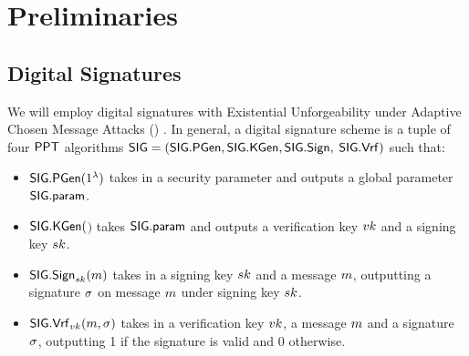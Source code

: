 \section{Preliminaries}


\subsection{Digital Signatures}\label{sec:sig}
We will employ digital signatures with Existential Unforgeability under Adaptive Chosen Message Attacks (\eufcma) \cite{C:GolMicRiv84}. In general, a digital signature scheme is a tuple of four $\mathsf{PPT}$ algorithms $\mathsf{SIG}=(\mathsf{SIG}.\mathsf{PGen},\mathsf{SIG}.\mathsf{KGen},\mathsf{SIG}.\mathsf{Sign},$ $\mathsf{SIG}.\mathsf{Vrf})$ such that:

\begin{itemize}[noitemsep]
\item $\mathsf{SIG}.\mathsf{PGen}(1^{\lambda})$ takes in a security parameter and outputs a global parameter $\mathsf{SIG}.\mathsf{param}$.
\item $\mathsf{SIG}.\mathsf{KGen}($\sigparam$)$ takes $\mathsf{SIG}.\mathsf{param}$ and outputs a verification key $vk$ and a signing key $sk$.
\item $\mathsf{SIG}.\mathsf{Sign}_{sk}(m)$ takes in a signing key $sk$ and a message $m$, outputting a signature $\sigma$ on message $m$ under signing key $sk$.
\item $\mathsf{SIG}.\mathsf{Vrf}_{vk}(m,\sigma)$ takes in a verification key $vk$, a message $m$ and a signature $\sigma$, outputting 1 if the signature is valid and 0 otherwise.
\end{itemize}

